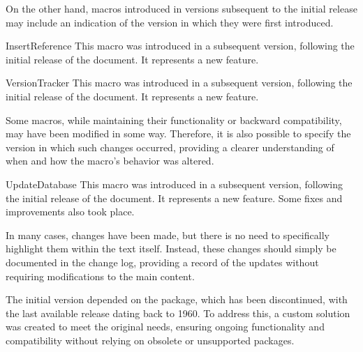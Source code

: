 \documentclass[a4paper, 11pt]{article}
\begin{document}
On the other hand, macros introduced in versions subsequent to the initial release may include an indication of the version in which they were first introduced.

\begin{DocsExample}
    \begin{Macro*}{InsertReference}{}{}
        This macro was introduced in a subsequent version, following the initial release of the document. It represents a new feature.
    \end{Macro*}

    \begin{Macro*}{VersionTracker}{}{}
        This macro was introduced in a subsequent version, following the initial release of the document. It represents a new feature.
    \end{Macro*}
\end{DocsExample}

Some macros, while maintaining their functionality or backward compatibility, may have been modified in some way. Therefore, it is also possible to specify the version in which such changes occurred, providing a clearer understanding of when and how the macro's behavior was altered.

\begin{DocsExample}
    \begin{Macro*}{UpdateDatabase}{}{}
        This macro was introduced in a subsequent version, following the initial release of the document. It represents a new feature. Some fixes and improvements also took place.
    \end{Macro*}
\end{DocsExample}

In many cases, changes have been made, but there is no need to specifically highlight them within the text itself. Instead, these changes should simply be documented in the change log, providing a record of the updates without requiring modifications to the main content.

\begin{DocsExample}
    The initial version depended on the  package, which has been discontinued, with the last available release dating back to 1960. To address this, a custom solution was created to meet the original needs, ensuring ongoing functionality and compatibility without relying on obsolete or unsupported packages.
\end{DocsExample}
\end{document}
